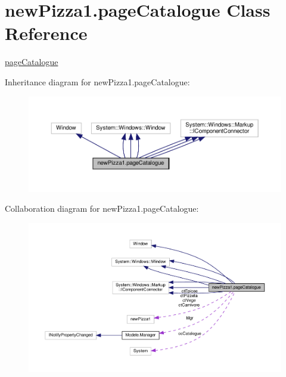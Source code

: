 \hypertarget{classnewPizza1_1_1pageCatalogue}{}\section{new\+Pizza1.\+page\+Catalogue Class Reference}
\label{classnewPizza1_1_1pageCatalogue}


\hyperlink{classnewPizza1_1_1pageCatalogue}{page\+Catalogue}  




Inheritance diagram for new\+Pizza1.\+page\+Catalogue\+:
\nopagebreak
\begin{figure}[H]
\begin{center}
\leavevmode
\includegraphics[width=350pt]{classnewPizza1_1_1pageCatalogue__inherit__graph}
\end{center}
\end{figure}


Collaboration diagram for new\+Pizza1.\+page\+Catalogue\+:
\nopagebreak
\begin{figure}[H]
\begin{center}
\leavevmode
\includegraphics[width=350pt]{classnewPizza1_1_1pageCatalogue__coll__graph}
\end{center}
\end{figure}

